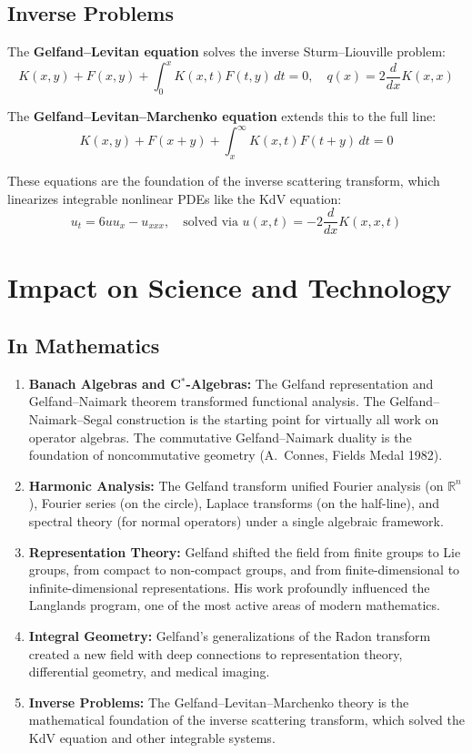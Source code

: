 \subsection{Inverse Problems}

The \textbf{Gelfand--Levitan equation} solves the inverse Sturm--Liouville problem:
\[
K(x,y) + F(x,y) + \int_0^x K(x,t)F(t,y)\,dt = 0, \quad q(x) = 2\frac{d}{dx}K(x,x)
\]

The \textbf{Gelfand--Levitan--Marchenko equation} extends this to the full line:
\[
K(x,y) + F(x+y) + \int_x^\infty K(x,t)F(t+y)\,dt = 0
\]

These equations are the foundation of the inverse scattering transform, which linearizes integrable nonlinear PDEs like the KdV equation:
\[
u_t = 6uu_x - u_{xxx}, \quad \text{solved via } u(x,t) = -2\frac{d}{dx}K(x,x,t)
\]

\section{Impact on Science and Technology}

\subsection{In Mathematics}

\begin{enumerate}
    \item \textbf{Banach Algebras and C$^*$-Algebras:} The Gelfand representation and Gelfand--Naimark theorem transformed functional analysis. The Gelfand--Naimark--Segal construction is the starting point for virtually all work on operator algebras. The commutative Gelfand--Naimark duality is the foundation of noncommutative geometry (A.\ Connes, Fields Medal 1982).
    
    \item \textbf{Harmonic Analysis:} The Gelfand transform unified Fourier analysis (on $\mathbb{R}^n$), Fourier series (on the circle), Laplace transforms (on the half-line), and spectral theory (for normal operators) under a single algebraic framework.
    
    \item \textbf{Representation Theory:} Gelfand shifted the field from finite groups to Lie groups, from compact to non-compact groups, and from finite-dimensional to infinite-dimensional representations. His work profoundly influenced the Langlands program, one of the most active areas of modern mathematics.
    
    \item \textbf{Integral Geometry:} Gelfand's generalizations of the Radon transform created a new field with deep connections to representation theory, differential geometry, and medical imaging.
    
    \item \textbf{Inverse Problems:} The Gelfand--Levitan--Marchenko theory is the mathematical foundation of the inverse scattering transform, which solved the KdV equation and other integrable systems.
\end{enumerate}

